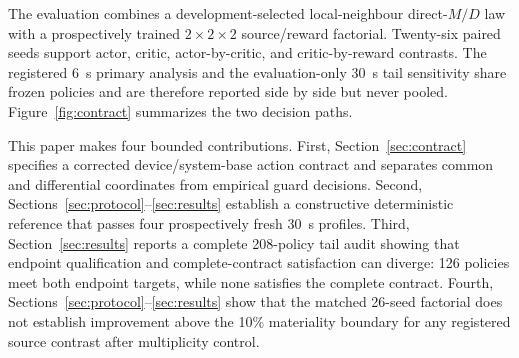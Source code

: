 \documentclass[conference,a4paper]{IEEEtran}
\begin{document}
The evaluation combines a development-selected local-neighbour direct-$M/D$
law with a prospectively trained $2\times2\times2$ source/reward factorial.
Twenty-six
paired seeds support actor, critic, actor-by-critic, and critic-by-reward
contrasts. The registered \SI{6}{s} primary analysis and the evaluation-only
\SI{30}{s} tail sensitivity share frozen policies and are therefore reported
side by side but never pooled. Figure~\ref{fig:contract} summarizes the two
decision paths.

This paper makes four bounded contributions. First, Section~\ref{sec:contract}
specifies a corrected device/system-base action contract and separates common
and differential coordinates from empirical guard decisions. Second,
Sections~\ref{sec:protocol}--\ref{sec:results} establish a constructive
deterministic reference that passes four prospectively fresh \SI{30}{s}
profiles. Third, Section~\ref{sec:results} reports a complete 208-policy tail
audit showing that endpoint qualification and complete-contract satisfaction
can diverge: 126 policies meet both endpoint targets, while none satisfies the
complete contract. Fourth, Sections~\ref{sec:protocol}--\ref{sec:results} show that the
matched 26-seed factorial does not establish improvement above the 10\%
materiality boundary for any registered source contrast after multiplicity
control.
\end{document}

